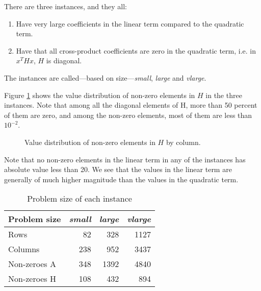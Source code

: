 There are three instances, and they all:
\begin{enumerate}
\item Have very large coefficients in the linear term compared to the
quadratic term.
\item Have that all cross-product coefficients are zero in the quadratic
term, i.e. in $x^T H x$, $H$ is diagonal.
\end{enumerate}
The instances are called---based on size---\textit{small}, \textit{large}
and \textit{vlarge}.

Figure \ref{fig:histH} shows the value distribution of non-zero elements in $H$
in the three instances. Note that among all the diagonal elements of H, more
than 50 percent of them are zero, and among the non-zero elements, most of them
are less than $10^{-2}$.
\begin{figure}[ht!]
\begin{center}

\end{center}
\caption{Value distribution of non-zero elements in $H$ by column.}
\label{fig:histH}
\end{figure}
Note that no non-zero elements in the linear term in any of the instances
has absolute value less than 20. We see that the values in the linear term
are generally of much higher magnitude than the values in the quadratic term.

\begin{table}[ht!]
    \centering
    \caption{Problem size of each instance}
    \begin{tabular}{lrrr}
    Problem size & \textit{small} & \textit{large} & \textit{vlarge} \\\hline
    Rows         & 82             & 328            & 1127 \\
    Columns      & 238            & 952            & 3437 \\
    Non-zeroes A & 348            & 1392           & 4840 \\
    Non-zeroes H & 108            & 432            & 894 \\
    \end{tabular}
    \label{table:sizes}
\end{table}

